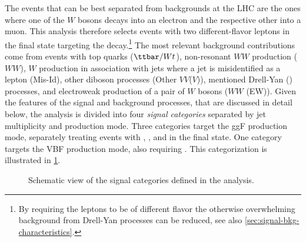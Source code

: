 The \HWW events that can be best separated from backgrounds at the LHC are the ones where one of the $W$ bosons decays into an electron and the respective other into a muon.
This analysis therefore selects events with two different-flavor leptons in the final state targeting the \HWWdet decay.\footnote{By requiring the leptons to be of different flavor the otherwise overwhelming background from Drell-Yan processes can be reduced, see also \cref{sec:signal-bkg-characteristics}.} 
The most relevant background contributions come from events with top quarks ($\ttbar/Wt$), non-resonant $WW$ production ($WW$), $W$ production in association with jets where a jet is misidentified as a lepton (Mis-Id), other diboson processes (Other $VV$($V$)), mentioned Drell-Yan (\Zgamma) processes, and electroweak production of a pair of $W$ bosons ($WW$ (EW)). 
Given the features of the signal and background processes, that are discussed in detail below, the analysis is divided into four \emph{signal categories} separated by jet multiplicity and production mode.
Three categories target the ggF production mode, separately treating events with \ZeroJet, \OneJet, and \TwoJet in the final state. One category targets the VBF production mode, also requiring \TwoJet. 
This categorization is illustrated in \cref{fig:signal-categorization}.
\begin{figure}
    \caption{Schematic view of the signal categories defined in the \HWW analysis.}
    \label{fig:signal-categorization}
\end{figure}

